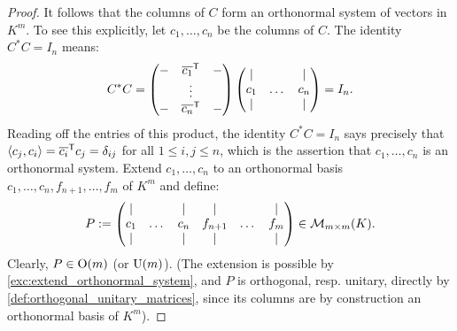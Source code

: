 \begin{proof}
It follows that the columns of $C$ form an orthonormal system of vectors in $K^m$. To see this explicitly, let $c_1, \dots, c_n$ be the columns of $C$. The identity $C^* C = I_n$ means:
\[
C^* C = 
\begin{pmatrix}
- & \overline{c_1}^{\mathsf{T}} & - \\
& \vdots & \\
- & \overline{c_n}^{\mathsf{T}} & -
\end{pmatrix}
\begin{pmatrix}
| & & | \\
c_1 & \dots & c_n \\
| & & |
\end{pmatrix}
= I_n.
\]
Reading off the entries of this product, the identity $C^* C = I_n$ says precisely that $\langle c_j, c_i \rangle = \overline{c_i}^{\mathsf{T}} c_j = \delta_{ij}$ for all $1 \leq i, j \leq n$, which is the assertion that $c_1, \dots, c_n$ is an orthonormal system.
Extend $c_1, \dots, c_n$ to an orthonormal basis $c_1, \dots, c_n, f_{n+1}, \dots, f_m$ of $K^m$ and define:
\[
P := \begin{pmatrix} | & & | & | & & | \\ c_1 & \dots & c_n & f_{n+1} & \dots & f_m \\ | & & | & | & & | \end{pmatrix} \in \mathcal{M}_{m \times m}(K).
\]
Clearly, $P \in \operatorname{O}(m)$ (or $\operatorname{U}(m)$).
(The extension is possible by \cref{exc:extend_orthonormal_system}, and $P$ is orthogonal, resp. unitary, directly by \cref{def:orthogonal_unitary_matrices}, since its columns are by construction an orthonormal basis of $K^m$).


\end{proof}
